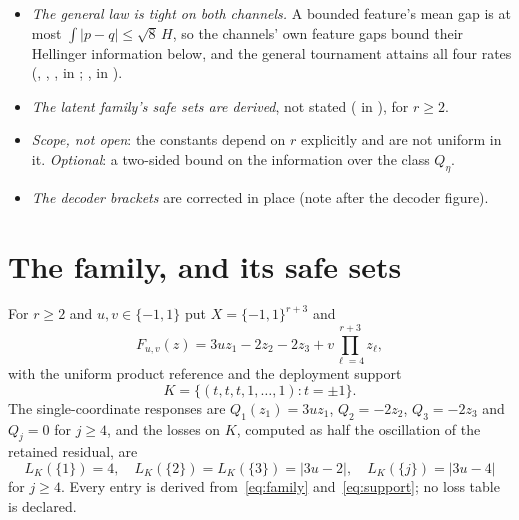 \begin{itemize}
test hypothesis of the upper law with the Hellinger information (,
, , ,
 in ).
\item \emph{The general law is tight on both channels.} A bounded feature's mean gap is at most
$\int|p-q|\le\sqrt8\,H$, so the channels' own feature gaps bound their Hellinger information
below, and the general tournament attains all four rates (,
, ,  in
; ,
 in ).
\item \emph{The latent family's safe sets are derived}, not stated ( in
), for $r\ge2$.
\item \emph{Scope, not open}: the constants depend on $r$ explicitly and are not uniform in it.
\emph{Optional}: a two-sided bound on the information over the class $Q_{\eta}$.
\item \emph{The decoder brackets} are corrected in place (note after the decoder figure).
\end{itemize}

\section{The family, and its safe sets}
\label{sec:family}

For $r\ge2$ and $u,v\in\{-1,1\}$ put $X=\{-1,1\}^{r+3}$ and
\begin{equation}
F_{u,v}(z)=3u z_{1}-2z_{2}-2z_{3}+v\prod_{\ell=4}^{r+3}z_{\ell},
\label{eq:family}
\end{equation}
with the uniform product reference and the deployment support
\begin{equation}
K=\bigl\{(t,t,t,1,\dots,1):t=\pm1\bigr\}.
\label{eq:support}
\end{equation}
The single-coordinate responses are $Q_{1}(z_{1})=3uz_{1}$, $Q_{2}=-2z_{2}$, $Q_{3}=-2z_{3}$
and $Q_{j}=0$ for $j\ge4$, and the losses on $K$, computed as half the oscillation of the
retained residual, are
\begin{equation}
L_{K}(\{1\})=4,\quad L_{K}(\{2\})=L_{K}(\{3\})=|3u-2|,\quad L_{K}(\{j\})=|3u-4|
\label{eq:losses}
\end{equation}
for $j\ge4$. Every entry is derived from~\eqref{eq:family} and~\eqref{eq:support}; no loss
table is declared. \CERT{}

